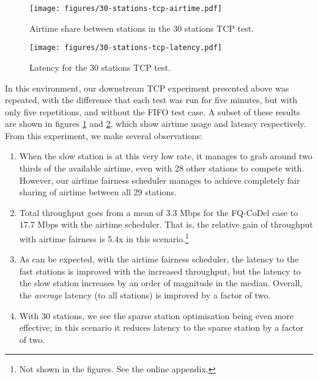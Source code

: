 \documentclass[english]{scrartcl}
\begin{document}
\begin{figure}[htbp]
\centering
\texttt{[image: figures/30-stations-tcp-airtime.pdf]}
\caption{\label{fig:30-stations-tcp-airtime}
Airtime share between stations in the 30 stations TCP test.}
\end{figure}

\begin{figure}[htbp]
\centering
\texttt{[image: figures/30-stations-tcp-latency.pdf]}
\caption{\label{fig:30-stations-tcp-latency}
Latency for the 30 stations TCP test.}
\end{figure}

In this environment, our downstream TCP experiment presented above was repeated,
with the difference that each test was run for five minutes, but with only five
repetitions, and without the FIFO test case. A subset of these results are shown
in figures \ref{fig:30-stations-tcp-airtime} and \ref{fig:30-stations-tcp-latency}, which
show airtime usage and latency respectively. From this experiment, we make
several observations:

\begin{enumerate}
\item When the slow station is at this very low rate, it manages to grab around two
thirds of the available airtime, even with 28 other stations to compete with.
However, our airtime fairness scheduler manages to achieve completely fair
sharing of airtime between all 29 stations.

\item Total throughput goes from a mean of \(3.3\) Mbps for the FQ-CoDel case to
\(17.7\) Mbps with the airtime scheduler. That is, the relative gain of
throughput with airtime fairness is 5.4x in this scenario.\footnote{Not shown in the figures. See the online appendix.}

\item As can be expected, with the airtime fairness scheduler, the latency to the
fast stations is improved with the increased throughput, but the latency to
the slow station increases by an order of magnitude in the median. Overall,
the \emph{average} latency (to all stations) is improved by a factor of two.

\item With 30 stations, we see the sparse station optimisation being even more
effective; in this scenario it reduces latency to the sparse station by a
factor of two.\footnotemark[4]
\end{enumerate}
\end{document}
